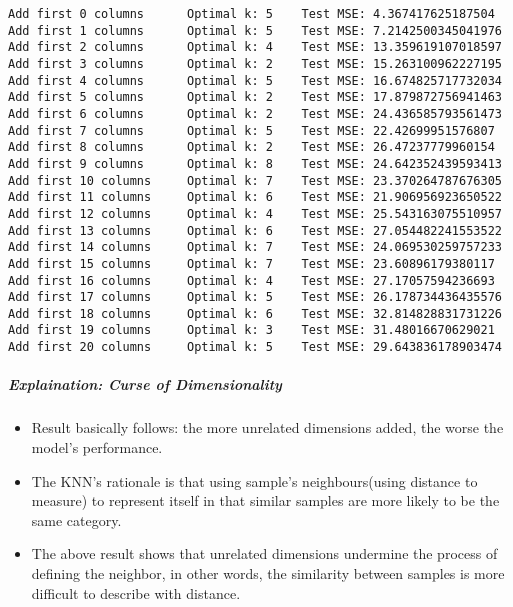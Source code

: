 \documentclass[11pt]{article}
\providecommand{\tightlist}{%
      \setlength{\itemsep}{0pt}\setlength{\parskip}{0pt}}
\begin{document}
    \begin{Verbatim}[commandchars=\\\{\}]
Add first 0 columns      Optimal k: 5    Test MSE: 4.367417625187504
Add first 1 columns      Optimal k: 5    Test MSE: 7.2142500345041976
Add first 2 columns      Optimal k: 4    Test MSE: 13.359619107018597
Add first 3 columns      Optimal k: 2    Test MSE: 15.263100962227195
Add first 4 columns      Optimal k: 5    Test MSE: 16.674825717732034
Add first 5 columns      Optimal k: 2    Test MSE: 17.879872756941463
Add first 6 columns      Optimal k: 2    Test MSE: 24.436585793561473
Add first 7 columns      Optimal k: 5    Test MSE: 22.42699951576807
Add first 8 columns      Optimal k: 2    Test MSE: 26.47237779960154
Add first 9 columns      Optimal k: 8    Test MSE: 24.642352439593413
Add first 10 columns     Optimal k: 7    Test MSE: 23.370264787676305
Add first 11 columns     Optimal k: 6    Test MSE: 21.906956923650522
Add first 12 columns     Optimal k: 4    Test MSE: 25.543163075510957
Add first 13 columns     Optimal k: 6    Test MSE: 27.054482241553522
Add first 14 columns     Optimal k: 7    Test MSE: 24.069530259757233
Add first 15 columns     Optimal k: 7    Test MSE: 23.60896179380117
Add first 16 columns     Optimal k: 4    Test MSE: 27.17057594236693
Add first 17 columns     Optimal k: 5    Test MSE: 26.178734436435576
Add first 18 columns     Optimal k: 6    Test MSE: 32.814828831731226
Add first 19 columns     Optimal k: 3    Test MSE: 31.48016670629021
Add first 20 columns     Optimal k: 5    Test MSE: 29.643836178903474
    \end{Verbatim}

    \hypertarget{explaination-curse-of-dimensionality}{%
\subparagraph{Explaination: Curse of
Dimensionality}\label{explaination-curse-of-dimensionality}}

\begin{itemize}
\tightlist
\item
  Result basically follows: the more unrelated dimensions added, the
  worse the model's performance.
\item
  The KNN's rationale is that using sample's neighbours(using distance
  to measure) to represent itself in that similar samples are more
  likely to be the same category.
\item
  The above result shows that unrelated dimensions undermine the process
  of defining the neighbor, in other words, the similarity between
  samples is more difficult to describe with distance.
\end{itemize}


    
    
    
\end{document}
